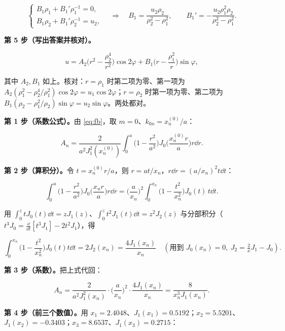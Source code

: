 \documentclass[11pt]{ctexart}
\begin{document}
\[
\begin{cases}
B_1\rho_1+B_1'\rho_1^{-1}=0,\\[2pt]
B_1\rho_2+B_1'\rho_2^{-1}=u_2,
\end{cases}
\quad\Longrightarrow\quad
B_1=\frac{u_2\rho_2}{\rho_2^2-\rho_1^2},\qquad B_1'=-\frac{u_2\rho_1^2\rho_2}{\rho_2^2-\rho_1^2}.
\]

\textbf{第 5 步（写出答案并核对）。}

\[
u=A_2\Big(r^2-\frac{\rho_2^4}{r^2}\Big)\cos2\varphi
+B_1\Big(r-\frac{\rho_1^2}{r}\Big)\sin\varphi ,
\]

其中 $A_2,B_1$ 如上。核对：$r=\rho_1$ 时第二项为零、第一项为 $A_2(\rho_1^2-\rho_2^4/\rho_1^2)\cos2\varphi=u_1\cos2\varphi$；$r=\rho_2$ 时第一项为零、第二项为 $B_1(\rho_2-\rho_1^2/\rho_2)\sin\varphi=u_2\sin\varphi$。两处都对。



\textbf{第 1 步（系数公式）。}由 \eqref{eq:fb}，取 $m=0$、$k_{0n}=x_n^{(0)}/a$：

\[
A_n=\frac{2}{a^2J_1^2(x_n^{(0)})}\int_0^a\Big(1-\frac{r^2}{a^2}\Big)J_0\Big(\frac{x_n^{(0)}r}{a}\Big)r\dd r .
\]

\textbf{第 2 步（算积分）。}令 $t=x_n^{(0)}r/a$，则 $r=a t/x_n$，$r\dd r=(a/x_n)^2t\dd t$：

\[
\int_0^a\Big(1-\frac{r^2}{a^2}\Big)J_0\Big(\frac{x_nr}{a}\Big)r\dd r
=\Big(\frac{a}{x_n}\Big)^2\int_0^{x_n}\Big(1-\frac{t^2}{x_n^2}\Big)J_0(t)\,t\dd t .
\]

用 $\int_0^ztJ_0(t)\dd t=zJ_1(z)$、$\int_0^zt^2J_1(t)\dd t=z^2J_2(z)$ 与分部积分（$t^3J_0=\frac{\dd}{\dd t}[t^3J_1]-2t^2J_1$），得

\[
\int_0^{x_n}\Big(1-\frac{t^2}{x_n^2}\Big)J_0(t)t\dd t
=2J_2(x_n)
=\frac{4J_1(x_n)}{x_n}\quad(\text{用到 }J_0(x_n)=0,\ J_2=\tfrac{2}{x}J_1-J_0).
\]

\textbf{第 3 步（系数）。}把上式代回：

\[
A_n=\frac{2}{a^2J_1^2(x_n)}\cdot\Big(\frac{a}{x_n}\Big)^2\cdot\frac{4J_1(x_n)}{x_n}
=\frac{8}{x_n^3J_1(x_n)} .
\]

\textbf{第 4 步（前三个数值）。}用 $x_1=2.4048$、$J_1(x_1)=0.5192$；$x_2=5.5201$、$J_1(x_2)=-0.3403$；$x_3=8.6537$、$J_1(x_3)=0.2715$：
\end{document}
